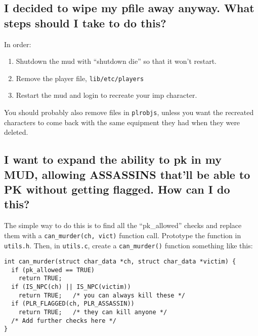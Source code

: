 \documentclass[11pt]{article}
\begin{document}
\subsection{I decided to wipe my pfile away anyway.  What steps should I take to do this?}
In order:
\begin{enumerate}
\item Shutdown the mud with ``shutdown die'' so that it won't restart.
\item Remove the player file, \texttt{lib/etc/players}
\item Restart the mud and login to recreate your imp character.
\end{enumerate}
You should probably also remove files in \texttt{plrobjs}, unless you want the recreated characters to come back with the same equipment they had when they were deleted.

\subsection{I want to expand the ability to pk in my MUD, allowing ASSASSINS that'll be able to PK without getting flagged.  How can I do this?}
The simple way to do this is to find all the ``pk\_allowed'' checks and replace them with a \texttt{can\_murder(ch, vict)} function call.  Prototype the function in \texttt{utils.h}.  Then, in \texttt{utils.c}, create a \texttt{can\_murder()} function something like this: 
\begin{verbatim}
int can_murder(struct char_data *ch, struct char_data *victim) {
  if (pk_allowed == TRUE)
    return TRUE;
  if (IS_NPC(ch) || IS_NPC(victim))
    return TRUE;   /* you can always kill these */
  if (PLR_FLAGGED(ch, PLR_ASSASSIN))
    return TRUE;   /* they can kill anyone */
  /* Add further checks here */
}
\end{verbatim}
\end{document}
